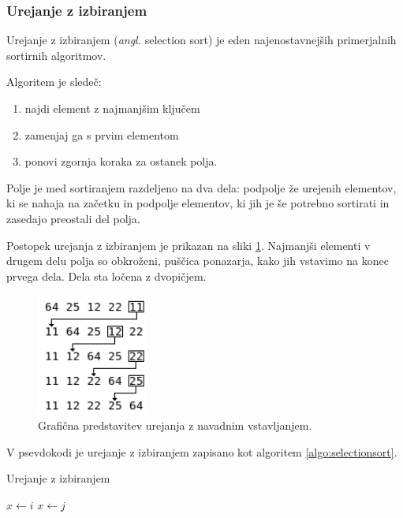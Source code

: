 \documentclass[a4paper,oneside,10pt]{article}
\begin{document}
\subsubsection{Urejanje z izbiranjem}
\label{chapter:selectionsort}
Urejanje z izbiranjem (\emph{angl.} selection sort) je eden najenostavnejših primerjalnih sortirnih
algoritmov.

Algoritem je sledeč:
\begin{enumerate}
  \item najdi element z najmanjšim ključem
  \item zamenjaj ga s prvim elementom
  \item ponovi zgornja koraka za ostanek polja.
\end{enumerate}

Polje je med sortiranjem razdeljeno na dva dela: podpolje že urejenih elementov, ki se
nahaja na začetku in podpolje elementov, ki jih je še potrebno sortirati in zasedajo
preostali del polja.

Postopek urejanja z izbiranjem je prikazan na sliki \ref{fig:selectionsortimage}.
Najmanjši elementi v drugem delu polja so obkroženi, puščica ponazarja, kako jih
vstavimo na konec prvega dela. Dela sta ločena z dvopičjem. %

\begin{figure}[h]
    \begin{center}
        \includegraphics[height=40mm]{slike/selectionsort.png}
    \end{center}
    \vspace{-0.7cm}
    \caption[Urejanje z izbiranjem]{Grafična predstavitev urejanja z navadnim vstavljanjem.}
    \label{fig:selectionsortimage}
\end{figure}

V psevdokodi je urejanje z izbiranjem zapisano kot algoritem \ref{algo:selectionsort}.

\begin{algorithm}
  \caption{Urejanje z izbiranjem}\label{algo:selectionsort}
  \begin{algorithmic}[1]
            \State $x \gets i$
                    \State $x \gets j$
                \EndIf
            \EndFor
        \EndFor
    \EndFunction
  \end{algorithmic}
\end{algorithm}
\end{document}
